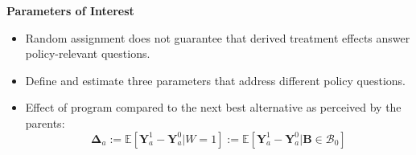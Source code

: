\documentclass[static]{JJH-Beamer}
\begin{document}
\begin{frame}

\begin{block}{}
\begin{center}
\textbf{Parameters of Interest}
\end{center}
\end{block}

\end{frame}

\begin{frame}

\begin{itemize}
\item Random assignment does not guarantee that derived treatment effects answer policy-relevant questions.
\item Define and estimate three parameters that address different policy questions.
\end{itemize}

\end{frame}

\begin{frame}

\begin{itemize}
\item Effect of program compared to the next best alternative as perceived by the parents:
	\begin{equation}\label{eq:effect}
	\bm{\Delta}_a := \mathbb{E} \left[ \bm{Y}^1_a -  \bm{Y}^0_a | W =1 \right] := \mathbb{E} \left[\bm{Y}^1_a - \bm{Y}^0_a | \bm{B} \in \mathcal{B}_0 \right]
	\end{equation}
\end{itemize}

\end{frame}
\end{document}
